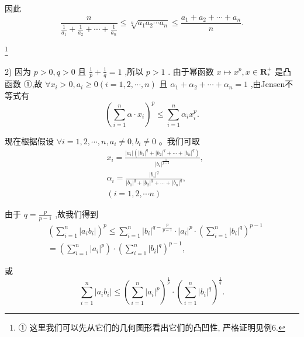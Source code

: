 因此
$$\frac{n}{\frac{1}{{a}_{1}} + \frac{1}{{a}_{2}} + \cdots  + \frac{1}{{a}_{n}}} \leq  \sqrt[n]{{a}_{1}{a}_{2}\cdots {a}_{n}} \leq  \frac{{a}_{1} + {a}_{2} + \cdots  + {a}_{n}}{n}.$$

\footnote{
	
	① 这里我们可以先从它们的几何图形看出它们的凸凹性, 严格证明见例6.
	
}

2) 因为 $p > 0,q > 0$ 且 $\frac{1}{p} + \frac{1}{q} = 1$ ,所以 $p > 1$ . 由于幂函数 $x \mapsto  {x}^{p},x \in  {\mathbf{R}}_{ * }^{ + }$ 是凸函数 ①,故 $\forall {x}_{i} > 0,{a}_{i} \geq  0\left( {i = 1,2,\cdots ,n}\right)$ 且 ${\alpha }_{1} + {\alpha }_{2} + \cdots  + {\alpha }_{n} = 1$ ,由Jensen不等式有
$${\left( \mathop{\sum }\limits_{{i = 1}}^{n}\alpha  \cdot  {x}_{i}\right) }^{p} \leq  \mathop{\sum }\limits_{{i = 1}}^{n}{\alpha }_{i}{x}_{i}^{p}.$$

现在根据假设 $\forall i = 1,2,\cdots ,n,{a}_{i} \neq  0,{b}_{i} \neq  0$ 。我们可取
\begin{align*}
	&{x}_{i} = \frac{\left| {a}_{i}\right| \left( {{\left| {b}_{1}\right| }^{q} + {\left| {b}_{2}\right| }^{q} + \cdots  + {\left| {b}_{n}\right| }^{q}}\right) }{{\left| {b}_{i}\right| }^{\frac{1}{p - 1}}},\\
	&{\alpha }_{i} = \frac{{\left| {b}_{i}\right| }^{q}}{{\left| {b}_{1}\right| }^{q} + {\left| {b}_{2}\right| }^{q} + \cdots  + {\left| {b}_{n}\right| }^{q}},\\
	&\left( {i = 1,2,\cdots n}\right)
\end{align*}

由于 $q = \frac{p}{p - 1}$ ,故我们得到
\begin{align*}
	&{\left( \mathop{\sum }\limits_{{i = 1}}^{n}\left| {a}_{i}{b}_{i}\right| \right) }^{p} \leq  \mathop{\sum }\limits_{{i = 1}}^{n}{\left| {b}_{i}\right| }^{q - \frac{p}{p - 1}} \cdot  {\left| {a}_{i}\right| }^{p} \cdot  {\left( \mathop{\sum }\limits_{{i = 1}}^{n}{\left| {b}_{i}\right| }^{q}\right) }^{p - 1}\\
	&= \left( {\mathop{\sum }\limits_{{i = 1}}^{n}{\left| {a}_{i}\right| }^{p}}\right)  \cdot  {\left( \mathop{\sum }\limits_{{i = 1}}^{n}{\left| {b}_{i}\right| }^{q}\right) }^{p - 1},
\end{align*}

或
$$\mathop{\sum }\limits_{{i = 1}}^{n}\left| {{a}_{i}{b}_{i}}\right|  \leq  {\left( \mathop{\sum }\limits_{{i = 1}}^{n}{\left| {a}_{i}\right| }^{p}\right) }^{\frac{1}{p}} \cdot  {\left( \mathop{\sum }\limits_{{i = 1}}^{n}{\left| {b}_{i}\right| }^{q}\right) }^{\frac{1}{q}}.$$

